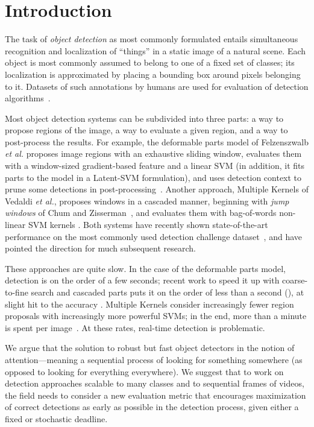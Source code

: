 \section{Introduction} \label{sec:introduction}
The task of \emph{object detection} as most commonly formulated entails simultaneous recognition and localization of ``things'' in a static image of a natural scene.
Each object is most commonly assumed to belong to one of a fixed set of classes; its localization is approximated by placing a bounding box around pixels belonging to it.
Datasets of such annotations by humans are used for evaluation of detection algorithms~\cite{pascal-voc-2010}.

Most object detection systems can be subdivided into three parts: a way to propose regions of the image, a way to evaluate a given region, and a way to post-process the results.
For example, the deformable parts model of Felzenszwalb \emph{et al.} proposes image regions with an exhaustive sliding window, evaluates them with a window-sized gradient-based feature and a linear SVM (in addition, it fits parts to the model in a Latent-SVM formulation), and uses detection context to prune some detections in post-processing~\cite{Felzenszwalb2010a,Felzenszwalb2010b}.
Another approach, Multiple Kernels of Vedaldi \emph{et al.}, proposes windows in a cascaded manner, beginning with \emph{jump windows} of Chum and Zisserman~\cite{Chum2007b}, and evaluates them with bag-of-words non-linear SVM kernels \cite{Vedaldi2009}.
Both systems have recently shown state-of-the-art performance on the most commonly used detection challenge dataset~\cite{pascal-voc-2010}, and have pointed the direction for much subsequent research.

These approaches are quite slow.
In the case of the deformable parts model, detection is on the order of a few seconds; recent work to speed it up with coarse-to-fine search and cascaded parts puts it on the order of less than a second (), at slight hit to the accuracy \cite{Pedersoli2011,Felzenszwalb2010b}.
Multiple Kernels consider increasingly fewer region proposals with increasingly more powerful SVMs; in the end, more than a minute is spent per image~\cite{Vijayanarasimhan2011}.
At these rates, real-time detection is problematic.

We argue that the solution to robust but fast object detectors in the notion of attention---meaning a sequential process of looking for something somewhere (as opposed to looking for everything everywhere).
We suggest that to work on detection approaches scalable to many classes and to sequential frames of videos, the field needs to consider a new evaluation metric that encourages maximization of correct detections as early as possible in the detection process, given either a fixed or stochastic deadline.

